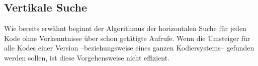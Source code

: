 \subsection{Vertikale Suche}
\label{vert-search}

Wie bereits erwähnt beginnt der Algorithmus der horizontalen Suche für jeden Kode ohne Vorkenntnisse über schon getätigte Aufrufe. Wenn die Umsteiger für alle Kodes einer Version --beziehungsweise eines ganzen Kodiersystems-- gefunden werden sollen, ist diese Vorgehensweise nicht effizient. 


